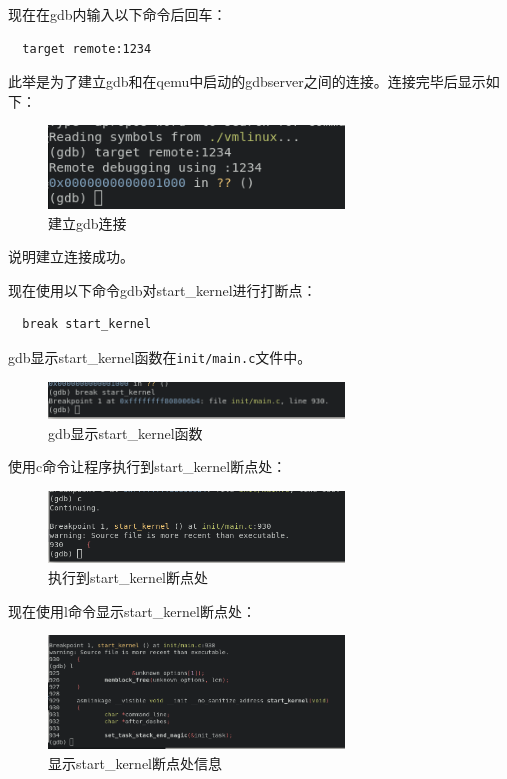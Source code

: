 \documentclass[lang=cn,10pt]{elegantbook}
\begin{document}
现在在gdb内输入以下命令后回车：

\begin{lstlisting}
  target remote:1234
\end{lstlisting}

此举是为了建立gdb和在qemu中启动的gdbserver之间的连接。连接完毕后显示如下：

\begin{figure}[htbp]
  \centering
  \includegraphics[width=0.7\textwidth]{image/image-20231105112104038.png}
  \caption{建立gdb连接}
\end{figure}

说明建立连接成功。

\newpage
现在使用以下命令gdb对start\_kernel进行打断点：

\begin{lstlisting}
  break start_kernel
\end{lstlisting}

gdb显示start\_kernel函数在\lstinline{init/main.c}文件中。

\begin{figure}[htbp]
  \centering
  \includegraphics[width=0.7\textwidth]{image/image-20231105112248991.png}
  \caption{gdb显示start\_kernel函数}
\end{figure}


使用c命令让程序执行到start\_kernel断点处：
\begin{figure}[htbp]
  \centering
  \includegraphics[width=0.7\textwidth]{image/image-20231105112437905.png}
  \caption{执行到start\_kernel断点处}
\end{figure}

现在使用l命令显示start\_kernel断点处：
\begin{figure}[htbp]
  \centering
  \includegraphics[width=0.7\textwidth]{image/image-20231105112512318.png}
  \caption{显示start\_kernel断点处信息}
\end{figure}
\end{document}
